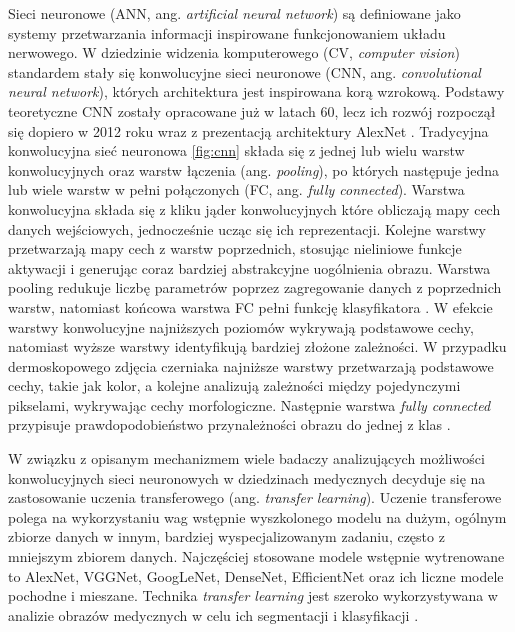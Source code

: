 Sieci neuronowe (ANN, ang. \textit{artificial neural network}) są definiowane jako systemy przetwarzania informacji inspirowane funkcjonowaniem układu nerwowego.
W dziedzinie widzenia komputerowego (CV, \textit{computer vision}) standardem stały się konwolucyjne sieci neuronowe (CNN, ang. \textit{convolutional neural network}), których architektura jest inspirowana korą wzrokową\cite{Ghosh_2020, Hubel_Wiesel_1968}.
Podstawy teoretyczne CNN zostały opracowane już w latach 60, lecz ich rozwój rozpoczął się dopiero w 2012 roku wraz z prezentacją architektury AlexNet \cite{Krizhevsky_2012, Hubel_Wiesel_1968}.
Tradycyjna konwolucyjna sieć neuronowa \ref{fig:cnn} składa się z jednej lub wielu warstw konwolucyjnych oraz warstw łączenia (ang. \textit{pooling}), po których następuje jedna lub wiele warstw w pełni połączonych (FC, ang. \textit{fully connected}).
Warstwa konwolucyjna składa się z kliku jąder konwolucyjnych które obliczają mapy cech danych wejściowych, jednocześnie ucząc się ich reprezentacji.
Kolejne warstwy przetwarzają mapy cech z warstw poprzednich, stosując nieliniowe funkcje aktywacji i generując coraz bardziej abstrakcyjne uogólnienia obrazu. 
Warstwa pooling redukuje liczbę parametrów poprzez zagregowanie danych z poprzednich warstw, natomiast końcowa warstwa FC pełni funkcję klasyfikatora \cite{Ghosh_2020}.
W efekcie warstwy konwolucyjne najniższych poziomów wykrywają podstawowe cechy, natomiast wyższe warstwy identyfikują bardziej złożone zależności.
W przypadku dermoskopowego zdjęcia czerniaka najniższe warstwy przetwarzają podstawowe cechy, takie jak kolor, a kolejne analizują zależności między pojedynczymi pikselami, wykrywając cechy morfologiczne. 
Następnie warstwa \textit{fully connected} przypisuje prawdopodobieństwo przynależności obrazu do jednej z klas \cite{Ghosh_2020}.

W związku z opisanym mechanizmem wiele badaczy analizujących możliwości konwolucyjnych sieci neuronowych w dziedzinach medycznych decyduje się na zastosowanie uczenia transferowego (ang. \textit{transfer learning}).
Uczenie transferowe polega na wykorzystaniu wag wstępnie wyszkolonego modelu na dużym, ogólnym zbiorze danych w innym, bardziej wyspecjalizowanym zadaniu, często z mniejszym zbiorem danych.
Najczęściej stosowane modele wstępnie wytrenowane to AlexNet, VGGNet, GoogLeNet, DenseNet, EfficientNet oraz ich liczne modele pochodne i mieszane.
Technika \textit{transfer learning} jest szeroko wykorzystywana w analizie obrazów medycznych w celu ich segmentacji i klasyfikacji \cite{Ghosh_2020, Mahbod_Schaefer_Wang_Dorffner_Ecker_Ellinger_2020}.

